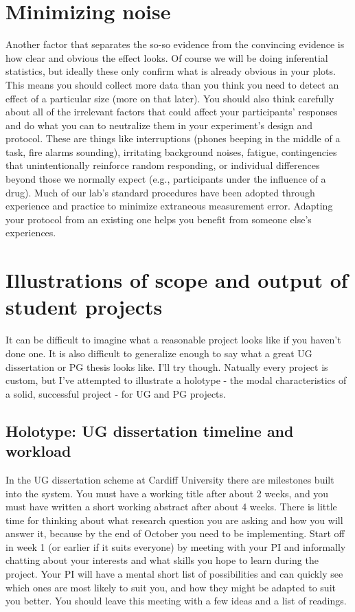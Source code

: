 \documentclass[12pt,]{book}
\theoremstyle{definition}
\theoremstyle{definition}
\theoremstyle{definition}
\theoremstyle{remark}
\begin{document}
\section{Minimizing noise}\label{minimizing-noise}

Another factor that separates the so-so evidence from the convincing
evidence is how clear and obvious the effect looks. Of course we will be
doing inferential statistics, but ideally these only confirm what is
already obvious in your plots. This means you should collect more data
than you think you need to detect an effect of a particular size (more
on that later). You should also think carefully about all of the
irrelevant factors that could affect your participants' responses and do
what you can to neutralize them in your experiment's design and
protocol. These are things like interruptions (phones beeping in the
middle of a task, fire alarms sounding), irritating background noises,
fatigue, contingencies that unintentionally reinforce random responding,
or individual differences beyond those we normally expect (e.g.,
participants under the influence of a drug). Much of our lab's standard
procedures have been adopted through experience and practice to minimize
extraneous measurement error. Adapting your protocol from an existing
one helps you benefit from someone else's experiences.

\section{Illustrations of scope and output of student
projects}\label{illustrations-of-scope-and-output-of-student-projects}

It can be difficult to imagine what a reasonable project looks like if
you haven't done one. It is also difficult to generalize enough to say
what a great UG dissertation or PG thesis looks like. I'll try though.
Natually every project is custom, but I've attempted to illustrate a
holotype - the modal characteristics of a solid, successful project -
for UG and PG projects.

\subsection{Holotype: UG dissertation timeline and
workload}\label{holotype-ug-dissertation-timeline-and-workload}

In the UG dissertation scheme at Cardiff University there are milestones
built into the system. You must have a working title after about 2
weeks, and you must have written a short working abstract after about 4
weeks. There is little time for thinking about what research question
you are asking and how you will answer it, because by the end of October
you need to be implementing. Start off in week 1 (or earlier if it suits
everyone) by meeting with your PI and informally chatting about your
interests and what skills you hope to learn during the project. Your PI
will have a mental short list of possibilities and can quickly see which
ones are most likely to suit you, and how they might be adapted to suit
you better. You should leave this meeting with a few ideas and a list of
readings.
\end{document}
